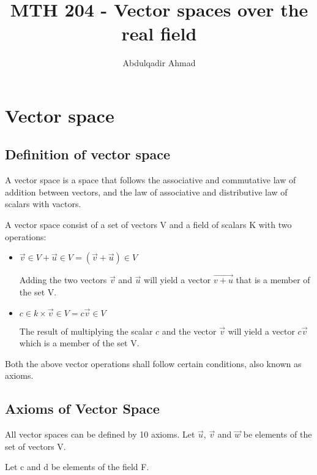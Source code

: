 \documentclass{book}
\title{MTH 204 {-} Vector spaces over the real field}
\author{Abdulqadir Ahmad}
\begin{document}
\maketitle
\tableofcontents

\chapter{Vector space}
\section{Definition of vector space}
A vector space is a space that follows the associative and commutative law of addition between vectors, and the law of associative and distributive law of scalars with vactors.

A vector space consist of a set of vectors V and a field of scalars K with two operations:

\begin{itemize}
	\item \(\vec v \in V + \vec u \in V = (\vec v + \vec u) \in V\)

		Adding the two vectors \(\vec v\) and \(\vec u\) will yield a vector \(\vec{v + u}\) that is a member of the set V.

	\item \(c \in k \times \vec v \in V = c \vec v \in V\)

		The result of multiplying the scalar \(c\) and the vector \(\vec v\) will yield a vector \(c\vec{v}\) which is a member of the set V.
\end{itemize}

Both the above vector operations shall follow certain conditions, also known as axioms.

\section{Axioms of Vector Space}
All vector spaces can be defined by 10 axioms.
Let \(\vec u\), \(\vec v\) and \(\vec w\) be elements of the set of vectors V.

Let c and d be elements of the field F.
\end{document}
